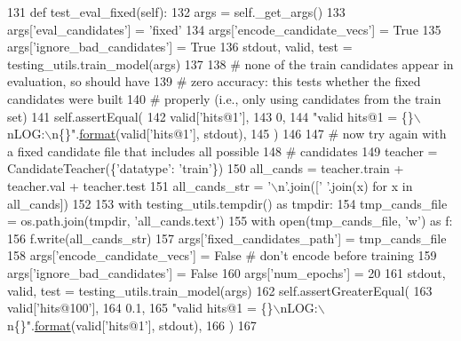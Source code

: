 \begin{DoxyCode}
131     \textcolor{keyword}{def }test\_eval\_fixed(self):
132         args = self.\_get\_args()
133         args[\textcolor{stringliteral}{'eval\_candidates'}] = \textcolor{stringliteral}{'fixed'}
134         args[\textcolor{stringliteral}{'encode\_candidate\_vecs'}] = \textcolor{keyword}{True}
135         args[\textcolor{stringliteral}{'ignore\_bad\_candidates'}] = \textcolor{keyword}{True}
136         stdout, valid, test = testing\_utils.train\_model(args)
137 
138         \textcolor{comment}{# none of the train candidates appear in evaluation, so should have}
139         \textcolor{comment}{# zero accuracy: this tests whether the fixed candidates were built}
140         \textcolor{comment}{# properly (i.e., only using candidates from the train set)}
141         self.assertEqual(
142             valid[\textcolor{stringliteral}{'hits@1'}],
143             0,
144             \textcolor{stringliteral}{"valid hits@1 = \{\}\(\backslash\)nLOG:\(\backslash\)n\{\}"}.\hyperlink{namespaceparlai_1_1chat__service_1_1services_1_1messenger_1_1shared__utils_a32e2e2022b824fbaf80c747160b52a76}{format}(valid[\textcolor{stringliteral}{'hits@1'}], stdout),
145         )
146 
147         \textcolor{comment}{# now try again with a fixed candidate file that includes all possible}
148         \textcolor{comment}{# candidates}
149         teacher = CandidateTeacher(\{\textcolor{stringliteral}{'datatype'}: \textcolor{stringliteral}{'train'}\})
150         all\_cands = teacher.train + teacher.val + teacher.test
151         all\_cands\_str = \textcolor{stringliteral}{'\(\backslash\)n'}.join([\textcolor{stringliteral}{' '}.join(x) \textcolor{keywordflow}{for} x \textcolor{keywordflow}{in} all\_cands])
152 
153         with testing\_utils.tempdir() \textcolor{keyword}{as} tmpdir:
154             tmp\_cands\_file = os.path.join(tmpdir, \textcolor{stringliteral}{'all\_cands.text'})
155             with open(tmp\_cands\_file, \textcolor{stringliteral}{'w'}) \textcolor{keyword}{as} f:
156                 f.write(all\_cands\_str)
157             args[\textcolor{stringliteral}{'fixed\_candidates\_path'}] = tmp\_cands\_file
158             args[\textcolor{stringliteral}{'encode\_candidate\_vecs'}] = \textcolor{keyword}{False}  \textcolor{comment}{# don't encode before training}
159             args[\textcolor{stringliteral}{'ignore\_bad\_candidates'}] = \textcolor{keyword}{False}
160             args[\textcolor{stringliteral}{'num\_epochs'}] = 20
161             stdout, valid, test = testing\_utils.train\_model(args)
162             self.assertGreaterEqual(
163                 valid[\textcolor{stringliteral}{'hits@100'}],
164                 0.1,
165                 \textcolor{stringliteral}{"valid hits@1 = \{\}\(\backslash\)nLOG:\(\backslash\)n\{\}"}.\hyperlink{namespaceparlai_1_1chat__service_1_1services_1_1messenger_1_1shared__utils_a32e2e2022b824fbaf80c747160b52a76}{format}(valid[\textcolor{stringliteral}{'hits@1'}], stdout),
166             )
167 
\end{DoxyCode}
